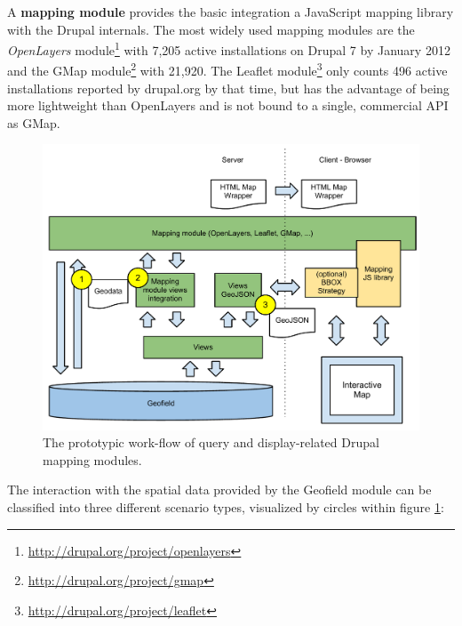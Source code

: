 A \textbf{mapping module} provides the basic integration a JavaScript mapping library with the Drupal internals. The most widely used mapping modules are the \textit{OpenLayers} module\footnote{\url{http://drupal.org/project/openlayers}} with 7,205 active installations on Drupal 7 by January 2012 and the GMap module\footnote{\url{http://drupal.org/project/gmap}} with 21,920. The Leaflet module\footnote{\url{http://drupal.org/project/leaflet}} only counts 496 active installations reported by drupal.org by that time, but has the advantage of being more lightweight than OpenLayers and is not bound to a single, commercial API as GMap.

\begin{figure}[h]
  \begin{center}
    \includegraphics[width=1\textwidth]{figures/drupal_mapping_display.pdf}
    \caption{The prototypic work-flow of query and display-related Drupal mapping modules.}
    \label{fig:drupal-mapping-display}
  \end{center}
\end{figure}

The interaction with the spatial data provided by the Geofield module can be classified into three different scenario types, visualized by circles within figure \ref{fig:drupal-mapping-display}:

